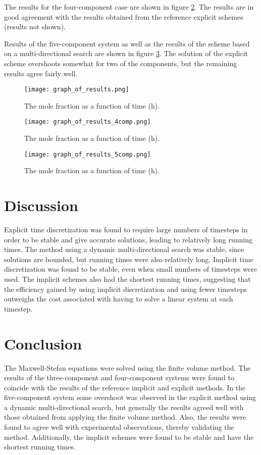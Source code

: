 \documentclass[11]{Report}
\begin{document}
The results for the four-component case are shown in figure \ref{fig:fig_2}. The results are in good agreement with the results obtained from the reference explicit schemes (results not shown).

Results of the five-component system as well as the results of the scheme based on a multi-directional search are shown in figure \ref{fig:fig_3}. The solution of the explicit scheme overshoots somewhat for two of the components, but the remaining results agree fairly well.

\begin{figure}
\texttt{[image: graph\_of\_results.png]}
\caption{The mole fraction as a function of time (h).}
\label{fig:fig_1}
\end{figure}

\begin{figure}
\texttt{[image: graph\_of\_results\_4comp.png]}
\caption{The mole fraction as a function of time (h).}
\label{fig:fig_2}
\end{figure}

\begin{figure}
\texttt{[image: graph\_of\_results\_5comp.png]}
\caption{The mole fraction as a function of time (h).}
\label{fig:fig_3}
\end{figure}

\section*{Discussion}
Explicit time discretization was found to require large numbers of timesteps in order to be stable and give accurate solutions, leading to relatively long running times. The method using a dynamic multi-directional search was stable, since solutions are bounded, but running times were also relatively long. Implicit time discretization was found to be stable, even when small numbers of timesteps were used. The implicit schemes also had the shortest running times, suggesting that the efficiency gained by using implicit discretization and using fewer timesteps outweighs the cost associated with having to solve a linear system at each timestep.

\section*{Conclusion}
The Maxwell-Stefan equations were solved using the finite volume method. The results of the three-component and four-component systems were found to coincide with the results of the reference implicit and explicit methods. In the five-component system some overshoot was observed in the explicit method using a dynamic multi-directional search, but generally the results agreed well with those obtained from applying the finite volume method. Also, the results were found to agree well with experimental observations, thereby validating the method. Additionally, the implicit schemes were found to be stable and have the shortest running times.
\end{document}
